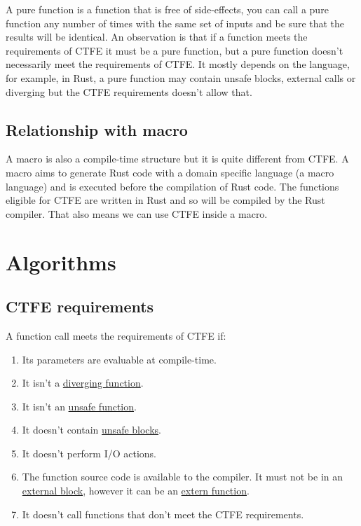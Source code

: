 \documentclass[a4paper,11pt]{article}
\begin{document}
A pure function is a function that is free of side-effects, you can call a pure function any number of times with the same set of inputs and be sure that the results will be identical. An observation is that if a function meets the requirements of CTFE it must be a pure function, but a pure function doesn't necessarily meet the requirements of CTFE. It mostly depends on the language, for example, in Rust, a pure function may contain unsafe blocks, external calls or diverging but the CTFE requirements doesn't allow that.

\subsection{Relationship with macro}
\label{relation-macro}

A macro is also a compile-time structure but it is quite different from CTFE. A macro aims to generate Rust code with a domain specific language (a macro language) and is executed before the compilation of Rust code. The functions eligible for CTFE are written in Rust and so will be compiled by the Rust compiler. That also means we can use CTFE inside a macro.

\section{Algorithms}

\subsection{CTFE requirements}
\label{ctfe-requirements}

A function call meets the requirements of CTFE if:

\begin{enumerate}
\item Its parameters are evaluable at compile-time.
\item It isn't a \href{http://static.rust-lang.org/doc/master/rust.html#diverging-functions}{diverging function}.
\item It isn't an \href{http://static.rust-lang.org/doc/master/rust.html#unsafe-functions}{unsafe function}.
\item It doesn't contain \href{http://static.rust-lang.org/doc/master/rust.html#unsafe-blocks}{unsafe blocks}.
\item It doesn't perform I/O actions.
\item The function source code is available to the compiler. It must not be in an \href{http://static.rust-lang.org/doc/master/rust.html#external-blocks}{external block}, however it can be an \href{http://static.rust-lang.org/doc/master/rust.html#extern-functions}{extern function}.
\item It doesn't call functions that don't meet the CTFE requirements.
\end{enumerate}
\end{document}
